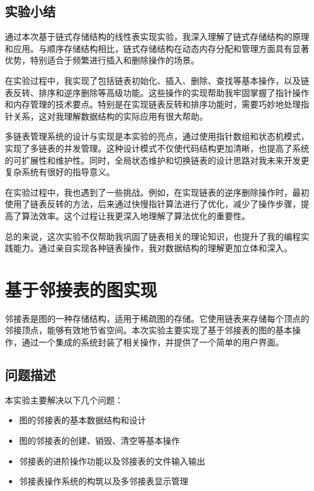 \documentclass[supercite]{Experimental_Report}
\theoremstyle{definition}
\begin{document}
\clearpage

\subsection{实验小结}
通过本次基于链式存储结构的线性表实现实验，我深入理解了链式存储结构的原理和应用。与顺序存储结构相比，链式存储结构在动态内存分配和管理方面具有显著优势，特别适合于频繁进行插入和删除操作的场景。

在实验过程中，我实现了包括链表初始化、插入、删除、查找等基本操作，以及链表反转、排序和逆序删除等高级功能。这些操作的实现帮助我牢固掌握了指针操作和内存管理的技术要点。特别是在实现链表反转和排序功能时，需要巧妙地处理指针关系，这对我理解数据结构的实际应用有很大帮助。

多链表管理系统的设计与实现是本实验的亮点，通过使用指针数组和状态机模式，实现了多链表的并发管理。这种设计模式不仅使代码结构更加清晰，也提高了系统的可扩展性和维护性。同时，全局状态维护和切换链表的设计思路对我未来开发更复杂系统有很好的指导意义。

在实验过程中，我也遇到了一些挑战。例如，在实现链表的逆序删除操作时，最初使用了链表反转的方法，后来通过快慢指针算法进行了优化，减少了操作步骤，提高了算法效率。这个过程让我更深入地理解了算法优化的重要性。

总的来说，这次实验不仅帮助我巩固了链表相关的理论知识，也提升了我的编程实践能力。通过亲自实现各种链表操作，我对数据结构的理解更加立体和深入。

\newpage


\section{基于邻接表的图实现}

邻接表是图的一种存储结构，适用于稀疏图的存储。它使用链表来存储每个顶点的邻接顶点，能够有效地节省空间。本次实验主要实现了基于邻接表的图的基本操作，通过一个集成的系统封装了相关操作，并提供了一个简单的用户界面。

\subsection{问题描述}

本实验主要解决以下几个问题：

\begin{itemize}[leftmargin=4em, label=$\bullet$]

	\item 图的邻接表的基本数据结构和设计
	\item 图的邻接表的创建、销毁、清空等基本操作
	\item 邻接表的进阶操作功能以及邻接表的文件输入输出
	\item 邻接表操作系统的构筑以及多邻接表显示管理
	
\end{itemize}
\end{document}
